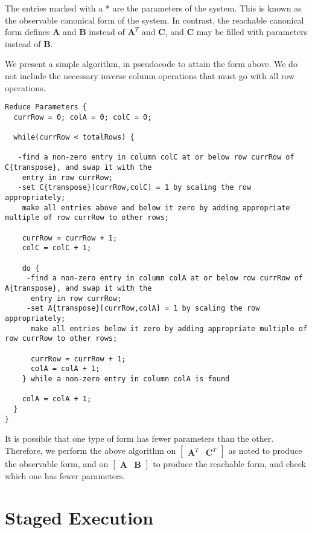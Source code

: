     The entries marked with a * are the parameters of the system.
This is known as the observable canonical form of the system. In
contrast, the reachable canonical form defines $\mathbf{A}$ and
$\mathbf{B}$ instead of $\mathbf{A}^T$ and $\mathbf{C}$, and
$\mathbf{C}$ may be filled with parameters instead of
$\mathbf{B}$.

    We present a simple algorithm, in pseudocode to attain the form
above. We do not include the necessary inverse column operations
that must go with all row operations.

\begin{scriptsize}
\begin{verbatim}
Reduce Parameters {
  currRow = 0; colA = 0; colC = 0;

  while(currRow < totalRows) {

   -find a non-zero entry in column colC at or below row currRow of C{transpose}, and swap it with the
    entry in row currRow;
   -set C{transpose}[currRow,colC] = 1 by scaling the row appropriately;
    make all entries above and below it zero by adding appropriate multiple of row currRow to other rows;

    currRow = currRow + 1;
    colC = colC + 1;

    do {
     -find a non-zero entry in column colA at or below row currRow of A{transpose}, and swap it with the
      entry in row currRow;
     -set A{transpose}[currRow,colA] = 1 by scaling the row appropriately;
      make all entries below it zero by adding appropriate multiple of row currRow to other rows;

      currRow = currRow + 1;
      colA = colA + 1;
    } while a non-zero entry in column colA is found

    colA = colA + 1;
  }
}
\end{verbatim}
\end{scriptsize}

    It is possible that one type of form has fewer parameters than the
other. Therefore, we perform the above algorithm on $\left [
\begin{array} {cc} \mathbf{A}^T & \mathbf{C}^T
\end{array} \right ]$ as noted to produce the observable form, and on $\left [
\begin{array} {cc} \mathbf{A} & \mathbf{B} \end{array} \right
]$ to produce the reachable form, and check which one has fewer
parameters.

\section{Staged Execution}

